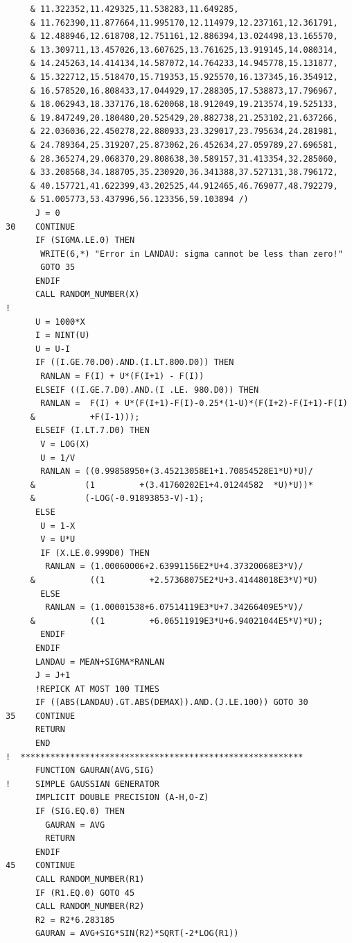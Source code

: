 \begin{lstlisting}
     & 11.322352,11.429325,11.538283,11.649285,
     & 11.762390,11.877664,11.995170,12.114979,12.237161,12.361791,
     & 12.488946,12.618708,12.751161,12.886394,13.024498,13.165570,
     & 13.309711,13.457026,13.607625,13.761625,13.919145,14.080314,
     & 14.245263,14.414134,14.587072,14.764233,14.945778,15.131877,
     & 15.322712,15.518470,15.719353,15.925570,16.137345,16.354912,
     & 16.578520,16.808433,17.044929,17.288305,17.538873,17.796967,
     & 18.062943,18.337176,18.620068,18.912049,19.213574,19.525133,
     & 19.847249,20.180480,20.525429,20.882738,21.253102,21.637266,
     & 22.036036,22.450278,22.880933,23.329017,23.795634,24.281981,
     & 24.789364,25.319207,25.873062,26.452634,27.059789,27.696581,
     & 28.365274,29.068370,29.808638,30.589157,31.413354,32.285060,
     & 33.208568,34.188705,35.230920,36.341388,37.527131,38.796172,
     & 40.157721,41.622399,43.202525,44.912465,46.769077,48.792279,
     & 51.005773,53.437996,56.123356,59.103894 /)
      J = 0
30    CONTINUE
      IF (SIGMA.LE.0) THEN 
       WRITE(6,*) "Error in LANDAU: sigma cannot be less than zero!"
       GOTO 35
      ENDIF
      CALL RANDOM_NUMBER(X)
!
      U = 1000*X
      I = NINT(U)
      U = U-I
      IF ((I.GE.70.D0).AND.(I.LT.800.D0)) THEN
       RANLAN = F(I) + U*(F(I+1) - F(I))
      ELSEIF ((I.GE.7.D0).AND.(I .LE. 980.D0)) THEN
       RANLAN =  F(I) + U*(F(I+1)-F(I)-0.25*(1-U)*(F(I+2)-F(I+1)-F(I)
     &           +F(I-1)));
      ELSEIF (I.LT.7.D0) THEN
       V = LOG(X)
       U = 1/V
       RANLAN = ((0.99858950+(3.45213058E1+1.70854528E1*U)*U)/
     &          (1         +(3.41760202E1+4.01244582  *U)*U))*
     &          (-LOG(-0.91893853-V)-1);
      ELSE
       U = 1-X
       V = U*U
       IF (X.LE.0.999D0) THEN
        RANLAN = (1.00060006+2.63991156E2*U+4.37320068E3*V)/
     &           ((1         +2.57368075E2*U+3.41448018E3*V)*U)
       ELSE
        RANLAN = (1.00001538+6.07514119E3*U+7.34266409E5*V)/
     &           ((1         +6.06511919E3*U+6.94021044E5*V)*U);
       ENDIF
      ENDIF
      LANDAU = MEAN+SIGMA*RANLAN
      J = J+1
      !REPICK AT MOST 100 TIMES
      IF ((ABS(LANDAU).GT.ABS(DEMAX)).AND.(J.LE.100)) GOTO 30
35    CONTINUE
      RETURN 
      END
!  *********************************************************
      FUNCTION GAURAN(AVG,SIG)
!     SIMPLE GAUSSIAN GENERATOR
      IMPLICIT DOUBLE PRECISION (A-H,O-Z)
      IF (SIG.EQ.0) THEN
        GAURAN = AVG
        RETURN
      ENDIF
45    CONTINUE
      CALL RANDOM_NUMBER(R1)
      IF (R1.EQ.0) GOTO 45
      CALL RANDOM_NUMBER(R2)
      R2 = R2*6.283185
      GAURAN = AVG+SIG*SIN(R2)*SQRT(-2*LOG(R1))

\end{lstlisting}
